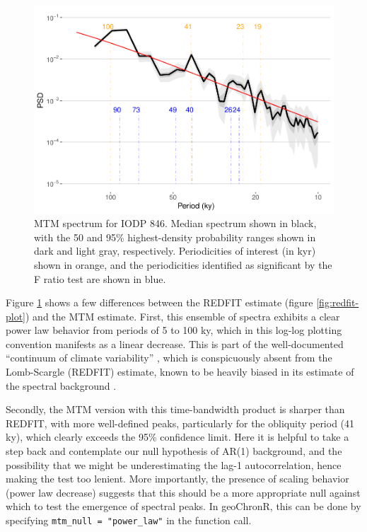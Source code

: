 \documentclass[gchron, manuscript]{copernicus}
\begin{document}
\begin{figure}
\includegraphics[width=12cm]{geoChronR-paper_files/figure-latex/mtm-ensemble-export-1} \caption{MTM spectrum for IODP 846. Median spectrum shown in black, with the 50 and 95\% highest-density probability ranges shown in dark and light gray, respectively. Periodicities of interest (in kyr) shown in orange, and the periodicities identified as significant by the F ratio test are shown in blue.}\label{fig:mtm-ensemble-export}
\end{figure}

Figure \ref{fig:mtm-ensemble-export} shows a few differences between the REDFIT estimate (figure \ref{fig:redfit-plot}) and the MTM estimate. First, this ensemble of spectra exhibits a clear power law behavior from periods of 5 to 100 ky, which in this log-log plotting convention manifests as a linear decrease.
This is part of the well-documented ``continuum of climate variability'' \citep{Huybers_Curry2006, ZhuPNAS2019}, which is conspicuously absent from the Lomb-Scargle (REDFIT) estimate, known to be heavily biased in its estimate of the spectral background \citep{schulz2002}.

Secondly, the MTM version with this time-bandwidth product is sharper than REDFIT, with more well-defined peaks, particularly for the obliquity period (41 ky), which clearly exceeds the 95\% confidence limit.
Here it is helpful to take a step back and contemplate our null hypothesis of AR(1) background, and the possibility that we might be underestimating the lag-1 autocorrelation, hence making the test too lenient.
More importantly, the presence of scaling behavior (power law decrease) suggests that this should be a more appropriate null against which to test the emergence of spectral peaks.
In geoChronR, this can be done by specifying \texttt{mtm\_null\ =\ "power\_law"} in the function call.
\end{document}
